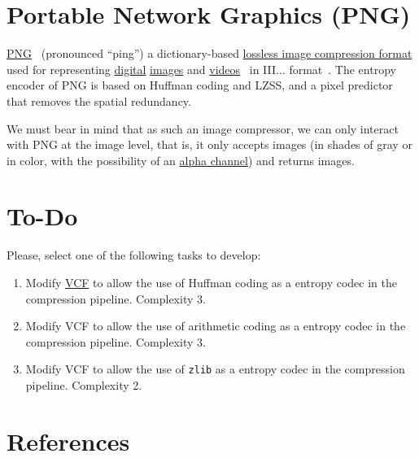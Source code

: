 \section{Portable Network Graphics (PNG)}

\href{https://en.wikipedia.org/wiki/Portable_Network_Graphics}{PNG}~\cite{vruiz__PNG}
(pronounced ``ping'') a dictionary-based
\href{https://en.wikipedia.org/wiki/Lossless_compression}{lossless
  image compression format} used for representing
\href{https://en.wikipedia.org/wiki/Digital_data}{digital}
\href{https://en.wikipedia.org/wiki/Digital_image}{images} and
\href{https://en.wikipedia.org/wiki/Video}{videos}~\cite{vruiz__image_video}
in III... format~\cite{vruiz__video_compression}. The entropy encoder
of PNG is based on Huffman coding and LZSS, and a pixel predictor that
removes the spatial redundancy.

We must bear in mind that as such an image compressor, we can only
interact with PNG at the image level, that is, it only accepts images
(in shades of gray or in color, with the possibility of an
\href{https://en.wikipedia.org/wiki/Alpha_compositing}{alpha channel})
and returns images.



\section{To-Do}
Please, select one of the following tasks to develop:
\begin{enumerate}
\item Modify \href{https://github.com/Sistemas-Multimedia/VCF}{VCF} to
  allow the use of Huffman coding as a entropy codec in the
  compression pipeline. Complexity 3.
\item Modify VCF to allow the use of arithmetic coding as a entropy
  codec in the compression pipeline. Complexity 3.
\item Modify VCF to allow the use of \texttt{zlib} as a entropy codec
  in the compression pipeline. Complexity 2.
\end{enumerate}

\section{References}

\renewcommand{\addcontentsline}[3]{}%

